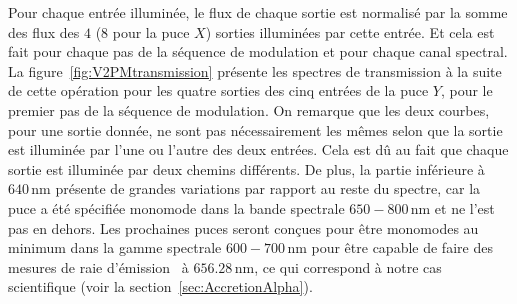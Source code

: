 Pour chaque entrée illuminée, le flux de chaque sortie est normalisé par la somme des flux des $4$ ($8$ pour la puce $X$) sorties illuminées par cette entrée. Et cela est fait pour chaque pas de la séquence de modulation et pour chaque canal spectral. La figure~\ref{fig:V2PMtransmission} présente les spectres de transmission à la suite de cette opération pour les quatre sorties des cinq entrées de la puce $Y$, pour le premier pas de la séquence de modulation. On remarque que les deux courbes, pour une sortie donnée, ne sont pas nécessairement les mêmes selon que la sortie est illuminée par l'une ou l'autre des deux entrées. Cela est dû au fait que chaque sortie est illuminée par deux chemins différents. De plus, la partie inférieure à $640 \,$nm présente de grandes variations par rapport au reste du spectre, car la puce a été spécifiée monomode dans la bande spectrale $650 - 800 \,$nm et ne l'est pas en dehors. Les prochaines puces seront conçues pour être monomodes au minimum dans la gamme spectrale $600 - 700 \,$nm pour être capable de faire des mesures de raie d'émission \ha~à $656.28 \,$nm, ce qui correspond à notre cas scientifique (voir la section~\ref{sec:AccretionAlpha}).

